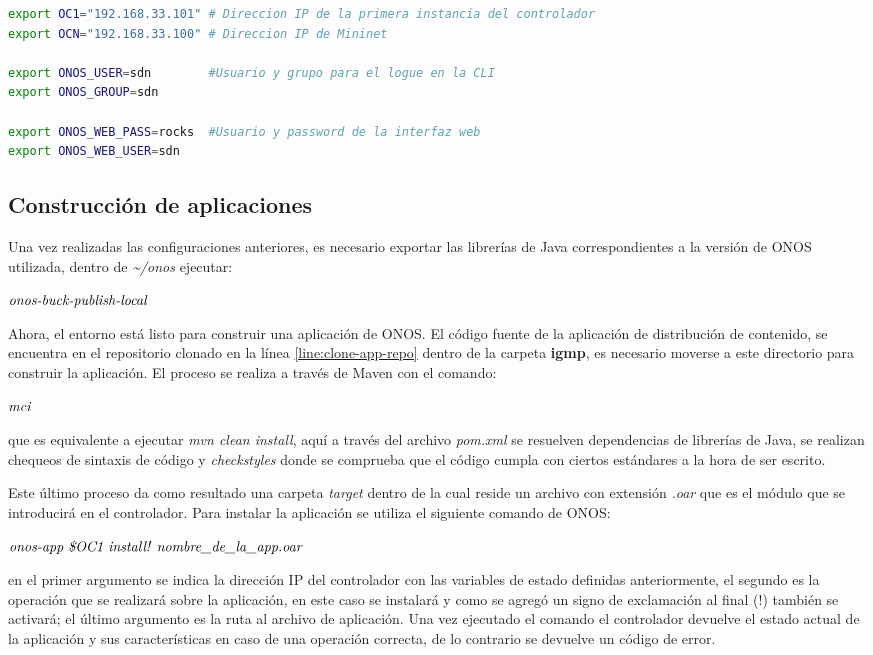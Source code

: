 \begin{lstlisting}[caption={Ejemplo de una cell de ONOS}, captionpos=b, label={lst:cell}, language=bash]
export OC1="192.168.33.101" # Direccion IP de la primera instancia del controlador
export OCN="192.168.33.100" # Direccion IP de Mininet

export ONOS_USER=sdn        #Usuario y grupo para el logue en la CLI
export ONOS_GROUP=sdn

export ONOS_WEB_PASS=rocks  #Usuario y password de la interfaz web
export ONOS_WEB_USER=sdn
\end{lstlisting}

\subsection{Construcción de aplicaciones}
Una vez realizadas las configuraciones anteriores, es necesario exportar las librerías de Java correspondientes a la versión de ONOS utilizada, dentro de \textit{\textasciitilde/onos} ejecutar: 
\begin{center}
    $ \emph {onos-buck-publish-local}$
\end{center}
Ahora, el entorno está listo para construir una aplicación de ONOS. El código fuente de la aplicación de distribución de contenido, se encuentra en el repositorio clonado en la línea \ref{line:clone-app-repo} dentro de la carpeta \textbf{igmp}, es necesario moverse a este directorio para construir la aplicación. El proceso se realiza a través de Maven con el comando:
\begin{center}
    $ \emph {mci}$
\end{center}
que es equivalente a ejecutar \textit{mvn clean install}, aquí a través del archivo \textit{pom.xml} se resuelven dependencias de librerías de Java, se realizan chequeos de sintaxis de código y \textit{checkstyles} donde se comprueba que el código cumpla con ciertos estándares a la hora de ser escrito.


Este último proceso da como resultado una carpeta \textit{target} dentro de la cual reside un archivo con extensión \textit{.oar} que es el módulo que se introducirá en el controlador. Para instalar la aplicación se utiliza el siguiente comando de ONOS:
\begin{center}
    $ \emph {onos-app \$OC1 install! nombre\_de\_la\_app.oar}$
\end{center}
en el primer argumento se indica la dirección IP del controlador con las variables de estado definidas anteriormente, el segundo es la operación que se realizará sobre la aplicación, en este caso se instalará y como se agregó un signo de exclamación al final ($!$) también se activará; el último argumento es la ruta al archivo de aplicación. Una vez ejecutado el comando el controlador devuelve el estado actual de la aplicación y sus características en caso de una operación correcta, de lo contrario se devuelve un código de error.

